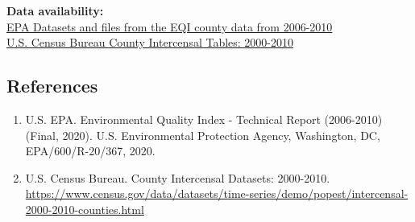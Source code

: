 \documentclass[
]{article}
\begin{document}
\textbf{Data availability:}\\
\href{https://edg.epa.gov/data/public/ORD/CPHEA/}{EPA Datasets and files
from the EQI county data from 2006-2010}\\
\href{https://www.census.gov/data/tables/time-series/demo/popest/intercensal-2000-2010-counties.html}{U.S.
Census Bureau County Intercensal Tables: 2000-2010}

\hypertarget{references}{%
\subsection{References}\label{references}}

\begin{enumerate}
\def\labelenumi{\arabic{enumi}.}
\item
  U.S. EPA. Environmental Quality Index - Technical Report (2006-2010)
  (Final, 2020). U.S. Environmental Protection Agency, Washington, DC,
  EPA/600/R-20/367, 2020.
\item
  U.S. Census Bureau. County Intercensal Datasets: 2000-2010.
  \url{https://www.census.gov/data/datasets/time-series/demo/popest/intercensal-2000-2010-counties.html}
\end{enumerate}
\end{document}
